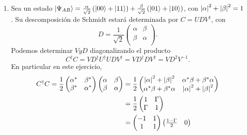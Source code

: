 \documentclass{scrartcl}
\newcommand{\inv}[1]{\frac{1}{#1}}
\DeclareRobustCommand{\[}{\begin{equation}}
\DeclareRobustCommand{\]}{\end{equation}}
\begin{document}
\begin{enumerate}
    \item Sea un estado $\ket{\Psi_{AB}} = \frac{\alpha}{\sqrt{2}} \left( \ket{00} + \ket{11} \right) + \frac{\beta}{\sqrt{2}} \left( \ket{01} + \ket{10} \right)$, con $\abs{\alpha}^2 + \abs{\beta}^2 = 1$. Su descomposición de Schmidt estará determinada por $C = U D V^\dagger$, con
    \[
        D = \inv{\sqrt{2}}
        \begin{pmatrix}
            \alpha & \beta \\
            \beta & \alpha \\
        \end{pmatrix}.
    \]
    Podemos determinar $V y D$ diagonalizando el producto
    \[ C^\dagger C = V D^\dagger U^\dagger U D V^\dagger = V D^\dagger D V^\dagger = V D^2 V^{-1}. \]
    En particular en este ejercicio,
    \begin{align}
        C^\dagger C = \inv{2}
        \begin{pmatrix}
            \alpha^* & \beta^* \\
            \beta^* & \alpha^*
        \end{pmatrix}
        \begin{pmatrix}
            \alpha & \beta \\
            \beta & \alpha
        \end{pmatrix}
        &= \inv{2}
        \begin{pmatrix}
            \abs{\alpha}^2 + \abs{\beta}^2 & \alpha^* \beta + \beta^* \alpha \\
            \alpha^* \beta + \beta^* \alpha & \abs{\alpha}^2 + \abs{\beta}^2
        \end{pmatrix} \\
        &= \inv{2}
        \begin{pmatrix}
            1 & \Gamma \\
            \Gamma & 1
        \end{pmatrix} \\
        &=
        \begin{pmatrix}
            -1 & 1 \\
            1 & 1
        \end{pmatrix}
        \begin{pmatrix}
            \frac{1-\Gamma}{2} & 0 \\

\end{pmatrix}
\end{align}
\end{enumerate}
\end{document}
